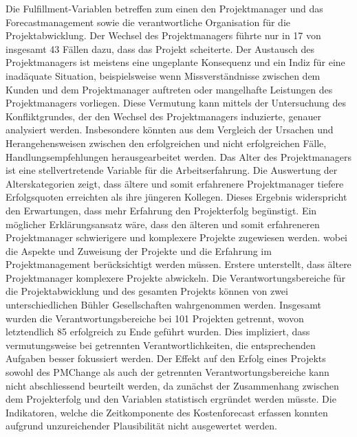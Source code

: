 Die Fulfillment-Variablen betreffen zum einen den Projektmanager und das Forecastmanagement sowie die verantwortliche Organisation für die Projektabwicklung. Der Wechsel des Projektmanagers führte nur in 17 von insgesamt 43 Fällen dazu, dass das Projekt scheiterte. Der Austausch des Projektmanagers ist meistens eine ungeplante Konsequenz und ein Indiz für eine inadäquate Situation, beispielsweise wenn Missverständnisse zwischen dem Kunden und dem Projektmanager auftreten oder mangelhafte Leistungen des Projektmanagers vorliegen. Diese Vermutung kann mittels der Untersuchung des Konfliktgrundes, der den Wechsel des Projektmanagers induzierte, genauer analysiert werden. Insbesondere könnten aus dem Vergleich der Ursachen und Herangehensweisen zwischen den erfolgreichen und nicht erfolgreichen Fälle, Handlungsempfehlungen herausgearbeitet werden. Das Alter des Projektmanagers ist eine stellvertretende Variable für die Arbeitserfahrung. Die Auswertung der Alterskategorien zeigt, dass ältere und somit erfahrenere Projektmanager tiefere Erfolgsquoten erreichten als ihre jüngeren Kollegen. Dieses Ergebnis widerspricht den Erwartungen, dass mehr Erfahrung den Projekterfolg begünstigt. Ein möglicher Erklärungsansatz wäre, dass den älteren und somit erfahreneren Projektmanager schwierigere und komplexere Projekte zugewiesen werden. wobei die Aspekte und Zuweisung der Projekte und die Erfahrung im Projektmanagement berücksichtigt werden müssen. Erstere unterstellt, dass ältere Projektmanager komplexere Projekte abwickeln. 
\newline Die Verantwortungsbereiche für die Projektabwicklung und des gesamten Projekts können von zwei unterschiedlichen Bühler Gesellschaften wahrgenommen werden. Insgesamt wurden die Verantwortungsbereiche bei 101 Projekten getrennt, wovon letztendlich 85 erfolgreich zu Ende geführt wurden. Dies impliziert, dass vermutungsweise bei getrennten Verantwortlichkeiten, die entsprechenden Aufgaben besser fokussiert werden. 
\newline Der Effekt auf den Erfolg eines Projekts sowohl des PMChange als auch der getrennten Verantwortungsbereiche kann nicht abschliessend beurteilt werden, da zunächst der Zusammenhang zwischen dem Projekterfolg und den Variablen statistisch ergründet werden müsste. Die Indikatoren, welche die Zeitkomponente des Kostenforecast erfassen konnten aufgrund unzureichender Plausibilität nicht ausgewertet werden. 
\newline\newline

